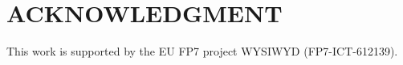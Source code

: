 \documentclass[letterpaper, 10 pt, conference]{ieeeconf}  %
\begin{document}
\addtolength{\textheight}{-12cm}   %



\section*{ACKNOWLEDGMENT}

This work is supported by the EU FP7 project WYSIWYD (FP7-ICT-612139). 





\end{document}
